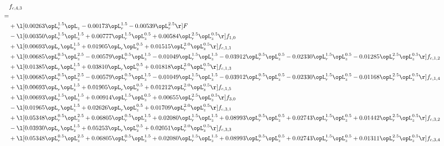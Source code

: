 \begin{alignat}{2} 
\label{eq:f_43_1} 
& f_{c,4,3} \nonumber \\ 
 = \\ 
& + \l[  0.00263 \opL_r^{1.5} \opL_z   -0.00173 \opL_r^{1.5}   -0.00539 \opL_r^{2.5}  \r] F \nonumber \\ 
& - \l[  0.00350 \opL_r^{1.5} \opL_z^{1.5} +  0.00777 \opL_r^{1.5} \opL_z^{0.5} +  0.00584 \opL_r^{2.5} \opL_z^{0.5}  \r] f_{1,0} \nonumber \\ 
& + \l[  0.00693 \opL_r \opL_z^{1.5} +  0.01905 \opL_r \opL_z^{0.5} +  0.01515 \opL_r^{2.0} \opL_z^{0.5}  \r] f_{c,1,1} \nonumber \\ 
& + \l[  0.00685 \opL_r^{0.5} \opL_z^{2.5}   -0.00579 \opL_r^{0.5} \opL_z^{1.5}   -0.01049 \opL_r^{1.5} \opL_z^{1.5}   -0.03912 \opL_r^{0.5} \opL_z^{0.5}   -0.02330 \opL_r^{1.5} \opL_z^{0.5}   -0.01285 \opL_r^{2.5} \opL_z^{0.5}  \r] f_{c,1,2} \nonumber \\ 
& + \l[  0.01385 \opL_r \opL_z^{1.5} +  0.03810 \opL_r \opL_z^{0.5} +  0.01818 \opL_r^{2.0} \opL_z^{0.5}  \r] f_{c,1,3} \nonumber \\ 
& + \l[  0.00685 \opL_r^{0.5} \opL_z^{2.5}   -0.00579 \opL_r^{0.5} \opL_z^{1.5}   -0.01049 \opL_r^{1.5} \opL_z^{1.5}   -0.03912 \opL_r^{0.5} \opL_z^{0.5}   -0.02330 \opL_r^{1.5} \opL_z^{0.5}   -0.01168 \opL_r^{2.5} \opL_z^{0.5}  \r] f_{c,1,4} \nonumber \\ 
& + \l[  0.00693 \opL_r \opL_z^{1.5} +  0.01905 \opL_r \opL_z^{0.5} +  0.01212 \opL_r^{2.0} \opL_z^{0.5}  \r] f_{c,1,5} \nonumber \\ 
& + \l[  0.00693 \opL_r^{1.5} \opL_z^{1.5} +  0.00914 \opL_r^{1.5} \opL_z^{0.5} +  0.00655 \opL_r^{2.5} \opL_z^{0.5}  \r] f_{3,0} \nonumber \\ 
& - \l[  0.01965 \opL_r \opL_z^{1.5} +  0.02626 \opL_r \opL_z^{0.5} +  0.01709 \opL_r^{2.0} \opL_z^{0.5}  \r] f_{c,3,1} \nonumber \\ 
& + \l[  0.05348 \opL_r^{0.5} \opL_z^{2.5} +  0.06805 \opL_r^{0.5} \opL_z^{1.5} +  0.02080 \opL_r^{1.5} \opL_z^{1.5} +  0.08993 \opL_r^{0.5} \opL_z^{0.5} +  0.02743 \opL_r^{1.5} \opL_z^{0.5} +  0.01442 \opL_r^{2.5} \opL_z^{0.5}  \r] f_{c,3,2} \nonumber \\ 
& - \l[  0.03930 \opL_r \opL_z^{1.5} +  0.05253 \opL_r \opL_z^{0.5} +  0.02051 \opL_r^{2.0} \opL_z^{0.5}  \r] f_{c,3,3} \nonumber \\ 
& + \l[  0.05348 \opL_r^{0.5} \opL_z^{2.5} +  0.06805 \opL_r^{0.5} \opL_z^{1.5} +  0.02080 \opL_r^{1.5} \opL_z^{1.5} +  0.08993 \opL_r^{0.5} \opL_z^{0.5} +  0.02743 \opL_r^{1.5} \opL_z^{0.5} +  0.01311 \opL_r^{2.5} \opL_z^{0.5}  \r] f_{c,3,4} \nonumber \\ 

\end{alignat}

